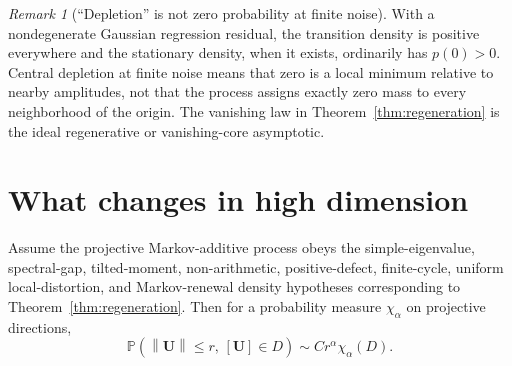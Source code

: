 \documentclass[10pt]{article}
\theoremstyle{definition}
\theoremstyle{remark}
\newtheorem{remark}[theorem]{Remark}
\newcommand{\Pp}{\mathbb P}
\newcommand{\norm}[1]{\left\lVert#1\right\rVert}
\begin{document}
\begin{remark}[``Depletion'' is not zero probability at finite noise]
With a nondegenerate Gaussian regression residual, the transition density is
positive everywhere and the stationary density, when it exists, ordinarily
has $p(0)>0$.  Central depletion at finite noise means that zero is a local
minimum relative to nearby amplitudes, not that the process assigns exactly
zero mass to every neighborhood of the origin.  The vanishing law in
Theorem~\ref{thm:regeneration} is the ideal regenerative or vanishing-core
asymptotic.
\end{remark}

\section{What changes in high dimension}

Assume the projective Markov-additive process obeys the simple-eigenvalue,
spectral-gap, tilted-moment, non-arithmetic, positive-defect, finite-cycle,
uniform local-distortion, and Markov-renewal density hypotheses corresponding
to Theorem~\ref{thm:regeneration}.  Then for a probability measure $\chi_\alpha$
on projective directions,
\begin{equation}
 \Pp(\norm{\mathbf U}\le r,\,[\mathbf U]\in D)
 \sim C r^\alpha\chi_\alpha(D).
 \label{eq:polar-law}
\end{equation}
\end{document}
